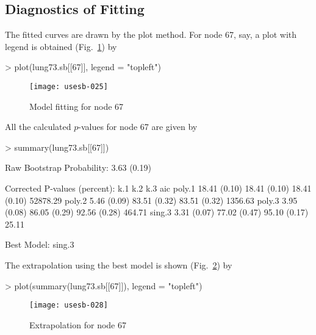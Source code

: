 \documentclass[a4paper]{amsart}
\begin{document}
\subsection{Diagnostics of Fitting}

The fitted curves are drawn by the plot method. For node 67, say, a
plot with legend is obtained (Fig.~\ref{fig:lungplot67}) by
\begin{Schunk}
\begin{Sinput}
> plot(lung73.sb[[67]], legend = "topleft")
\end{Sinput}
\end{Schunk}
\begin{figure}
\begin{center}
\texttt{[image: usesb-025]}
\caption{Model fitting for node 67}\label{fig:lungplot67}
\end{center}
\end{figure}
All the calculated $p$-values for node 67 are given by
\begin{Schunk}
\begin{Sinput}
> summary(lung73.sb[[67]])
\end{Sinput}
\begin{Soutput}
Raw Bootstrap Probability:  3.63 (0.19) 

Corrected P-values (percent):
       k.1          k.2          k.3          aic      
poly.1 18.41 (0.10) 18.41 (0.10) 18.41 (0.10) 52878.29 
poly.2  5.46 (0.09) 83.51 (0.32) 83.51 (0.32)  1356.63 
poly.3  3.95 (0.08) 86.05 (0.29) 92.56 (0.28)   464.71 
sing.3  3.31 (0.07) 77.02 (0.47) 95.10 (0.17)    25.11 

Best Model:  sing.3 
\end{Soutput}
\end{Schunk}
The extrapolation using the best model is shown
(Fig.~\ref{fig:lungext67}) by
\begin{Schunk}
\begin{Sinput}
> plot(summary(lung73.sb[[67]]), legend = "topleft")
\end{Sinput}
\end{Schunk}
\begin{figure}
\begin{center}
\texttt{[image: usesb-028]}
\caption{Extrapolation for node 67}\label{fig:lungext67}
\end{center}
\end{figure}
\end{document}
